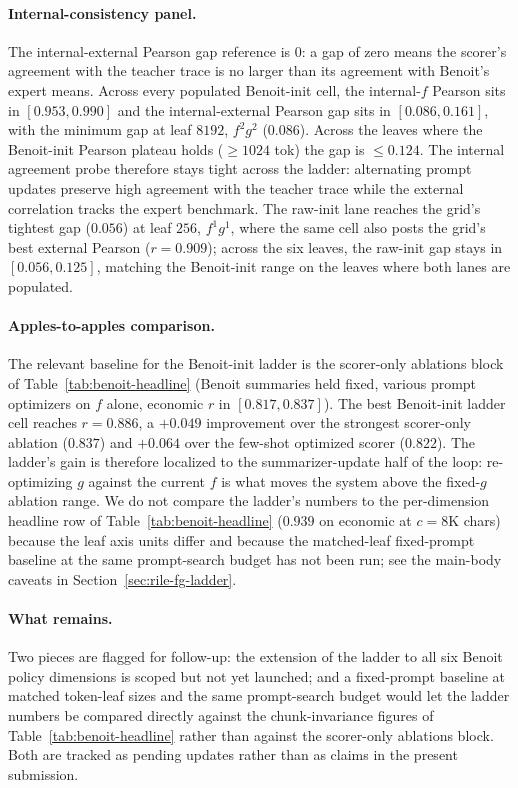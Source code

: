 \paragraph{Internal-consistency panel.} The internal-external Pearson
gap reference is $0$: a gap of zero means the scorer's agreement with
the teacher trace is no larger than its agreement with Benoit's expert
means. Across every populated Benoit-init cell, the internal-$f$ Pearson
sits in $[0.953, 0.990]$ and the internal-external Pearson gap sits in
$[0.086, 0.161]$, with the minimum gap at leaf $8192$, $f^2 g^2$
($0.086$). Across the leaves where the Benoit-init Pearson plateau holds
($\geq 1024$ tok) the gap is $\leq 0.124$. The internal agreement
probe therefore stays tight across the ladder: alternating prompt
updates preserve high agreement with the teacher trace while the
external correlation tracks the expert benchmark. The raw-init lane
reaches the grid's tightest gap ($0.056$) at leaf $256$, $f^1 g^1$,
where the same cell also posts the grid's best external Pearson
($r = 0.909$); across the six leaves, the raw-init gap stays in
$[0.056, 0.125]$, matching the Benoit-init range on the leaves where
both lanes are populated.

\paragraph{Apples-to-apples comparison.} The relevant baseline for the
Benoit-init ladder is the scorer-only ablations block of
Table~\ref{tab:benoit-headline} (Benoit summaries held fixed, various
prompt optimizers on $f$ alone, economic $r$ in $[0.817, 0.837]$). The
best Benoit-init ladder cell reaches $r = 0.886$, a $+0.049$
improvement over the strongest scorer-only ablation ($0.837$) and
$+0.064$ over the few-shot optimized scorer ($0.822$). The
    ladder's gain is therefore localized to the summarizer-update half of
    the loop: re-optimizing $g$ against the current $f$ is what moves the
    system above the fixed-$g$ ablation range. We do not compare the ladder's numbers
to the per-dimension headline row of Table~\ref{tab:benoit-headline}
($0.939$ on economic at $c = 8\mathrm{K}$ chars) because the leaf axis
units differ and because the matched-leaf fixed-prompt baseline at the
same prompt-search budget has not been run; see the main-body caveats in
Section~\ref{sec:rile-fg-ladder}.

\paragraph{What remains.} Two pieces are flagged for follow-up: the
extension of the ladder to all six Benoit policy dimensions is scoped
but not yet launched; and a fixed-prompt baseline at matched token-leaf
sizes and the same prompt-search budget would let the ladder numbers
be compared directly against the chunk-invariance figures of
Table~\ref{tab:benoit-headline} rather than against the scorer-only
ablations block. Both are tracked as pending updates rather than as
claims in the present submission.
